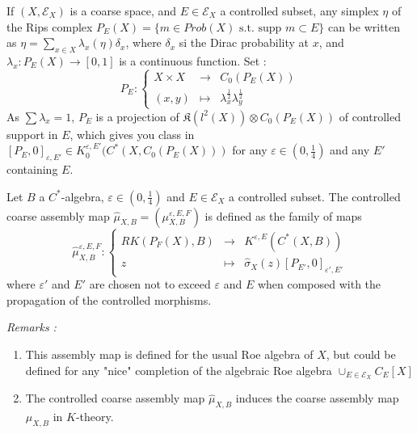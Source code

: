 If $(X,\mathcal E_X)$ is a coarse space, and $E\in\mathcal E_X$ a controlled subset, any simplex $\eta$ of the Rips complex $P_E(X) = \{m \in Prob(X)\text{ s.t. supp }m \subset E\}$ can be written as $\eta = \sum_{x\in X} \lambda_x(\eta) \delta_x$, where $\delta_x$ si the Dirac probability at $x$, and $\lambda_x : P_E(X)\rightarrow [0,1]$ is a continuous function. Set :
\[ P_E : \left\{\begin{array}{rcl} X \times X & \rightarrow & C_0(P_E(X))\\  (x,y) & \mapsto & \lambda_x^{\frac{1}{2}}\lambda_y^{\frac{1}{2}}\end{array}\right. \]  
As $\sum \lambda_x =1$, $P_E$ is a projection of $\mathfrak K(l^2(X)) \otimes C_0(P_E(X))$ of controlled support in $E$, which gives you class in $[P_E,0]_{\varepsilon, E'}\in K_0^{\varepsilon, E'} (C^*(X,C_0(P_E(X)))$ for any $\varepsilon\in (0,\frac{1}{4})$ and any $E'$ containing $E$.\\

\begin{definition}
Let $B$ a $C^*$-algebra, $\varepsilon\in (0,\frac{1}{4})$ and $E\in\mathcal E_X$ a controlled subset. The controlled coarse assembly map $\hat\mu_{X,B}=(\mu_{X,B}^{\varepsilon,E,F})$ is defined as the family of maps
\[\hat\mu_{X,B}^{\varepsilon, E,F} :\left\{\begin{array}{rcl} RK(P_F(X),B) & \rightarrow & K^{\varepsilon, E}(C^*(X,B)) \\
					z & \mapsto & \hat\sigma_X(z)[P_{E'},0]_{\varepsilon', E'}\end{array}\right.\]
where $\varepsilon'$ and $E'$ are chosen not to exceed $\varepsilon$ and $E$ when composed with the propagation of the controlled morphisms. 
\end{definition}

\textit{Remarks :}
\begin{enumerate}
\item This assembly map is defined for the usual Roe algebra of $X$, but could be defined for any "nice" completion of the algebraic Roe algebra $\cup_{E\in \mathcal E_X} C_E[X]$
\item The controlled coarse assembly map $\hat \mu_{X,B}$ induces the coarse assembly map $\mu_{X,B}$ in $K$-theory.
\end{enumerate}

 

































